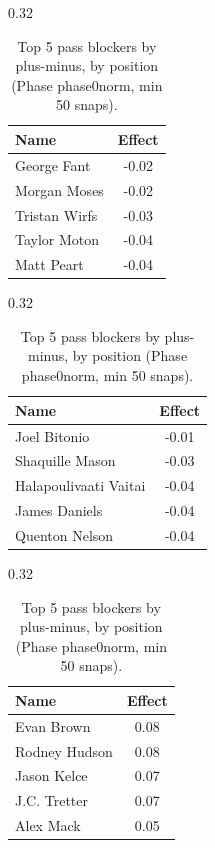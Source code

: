 \begin{table}[h!]
\centering
\begin{subtable}{0.32\textwidth}
\centering
\footnotesize
\begin{tabular}{lc}
\toprule
Name & Effect \\
\midrule
George Fant & -0.02 \\
Morgan Moses & -0.02 \\
Tristan Wirfs & -0.03 \\
Taylor Moton & -0.04 \\
Matt Peart & -0.04 \\
\bottomrule
\end{tabular}
\caption{T}
\end{subtable}
\hfill
\begin{subtable}{0.32\textwidth}
\centering
\footnotesize
\begin{tabular}{lc}
\toprule
Name & Effect \\
\midrule
Joel Bitonio & -0.01 \\
Shaquille Mason & -0.03 \\
Halapoulivaati Vaitai & -0.04 \\
James Daniels & -0.04 \\
Quenton Nelson & -0.04 \\
\bottomrule
\end{tabular}
\caption{G}
\end{subtable}
\hfill
\begin{subtable}{0.32\textwidth}
\centering
\footnotesize
\begin{tabular}{lc}
\toprule
Name & Effect \\
\midrule
Evan Brown & 0.08 \\
Rodney Hudson & 0.08 \\
Jason Kelce & 0.07 \\
J.C. Tretter & 0.07 \\
Alex Mack & 0.05 \\
\bottomrule
\end{tabular}
\caption{C}
\end{subtable}
\caption{Top 5 pass blockers by plus-minus, by position (Phase phase0norm, min 50 snaps).}
\label{tab:blocker_pm_phase0norm_top}
\end{table}

